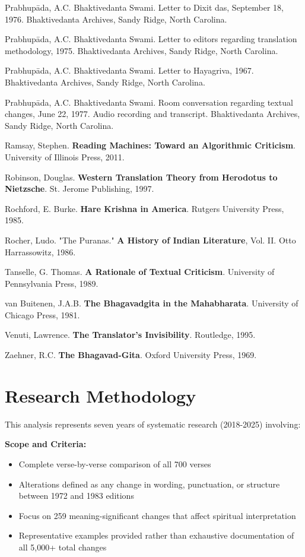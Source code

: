 \documentclass[11pt,twoside]{book}
\begin{document}
Prabhupāda, A.C. Bhaktivedanta Swami. Letter to Dixit das, September 18, 1976. Bhaktivedanta Archives, Sandy Ridge, North Carolina.

Prabhupāda, A.C. Bhaktivedanta Swami. Letter to editors regarding translation methodology, 1975. Bhaktivedanta Archives, Sandy Ridge, North Carolina.

Prabhupāda, A.C. Bhaktivedanta Swami. Letter to Hayagriva, 1967. Bhaktivedanta Archives, Sandy Ridge, North Carolina.

Prabhupāda, A.C. Bhaktivedanta Swami. Room conversation regarding textual changes, June 22, 1977. Audio recording and transcript. Bhaktivedanta Archives, Sandy Ridge, North Carolina.

Ramsay, Stephen. \textbf{Reading Machines: Toward an Algorithmic Criticism}. University of Illinois Press, 2011.

Robinson, Douglas. \textbf{Western Translation Theory from Herodotus to Nietzsche}. St. Jerome Publishing, 1997.

Rochford, E. Burke. \textbf{Hare Krishna in America}. Rutgers University Press, 1985.

Rocher, Ludo. "The Puranas." \textbf{A History of Indian Literature}, Vol. II. Otto Harrassowitz, 1986.

Tanselle, G. Thomas. \textbf{A Rationale of Textual Criticism}. University of Pennsylvania Press, 1989.

van Buitenen, J.A.B. \textbf{The Bhagavadgita in the Mahabharata}. University of Chicago Press, 1981.

Venuti, Lawrence. \textbf{The Translator's Invisibility}. Routledge, 1995.

Zaehner, R.C. \textbf{The Bhagavad-Gita}. Oxford University Press, 1969.
\section*{Research Methodology}
\label{sec:org0dd3ff2}

This analysis represents seven years of systematic research (2018-2025) involving:

\textbf{\textbf{Scope and Criteria:}}
\begin{itemize}
\item Complete verse-by-verse comparison of all 700 verses
\item Alterations defined as any change in wording, punctuation, or structure between 1972 and 1983 editions
\item Focus on 259 meaning-significant changes that affect spiritual interpretation
\item Representative examples provided rather than exhaustive documentation of all 5,000+ total changes
\end{itemize}
\end{document}
